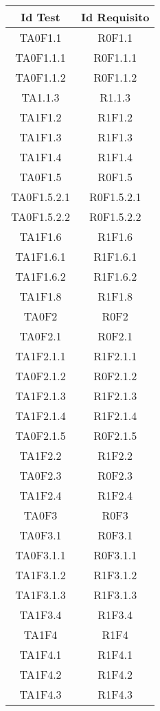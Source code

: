 	\begin{longtable}{|c|c|}
		\hline
		\textbf{Id Test} & \textbf{Id Requisito}\\
		\hline
		\endhead
		TA0F1.1&R0F1.1 \\ \hline
		TA0F1.1.1&R0F1.1.1 \\ \hline
		TA0F1.1.2&R0F1.1.2 \\ \hline
		TA1.1.3&R1.1.3 \\ \hline
		TA1F1.2&R1F1.2 \\ \hline
		TA1F1.3&R1F1.3 \\ \hline
		TA1F1.4&R1F1.4 \\ \hline
		TA0F1.5&R0F1.5 \\ \hline
		TA0F1.5.2.1&R0F1.5.2.1 \\ \hline
		TA0F1.5.2.2&R0F1.5.2.2 \\ \hline
		TA1F1.6&R1F1.6 \\ \hline
		TA1F1.6.1&R1F1.6.1 \\ \hline
		TA1F1.6.2&R1F1.6.2 \\ \hline
		TA1F1.8&R1F1.8 \\ \hline
		TA0F2&R0F2 \\ \hline
		TA0F2.1&R0F2.1 \\ \hline
		TA1F2.1.1&R1F2.1.1 \\ \hline
		TA0F2.1.2&R0F2.1.2 \\ \hline
		TA1F2.1.3&R1F2.1.3 \\ \hline
		TA1F2.1.4&R1F2.1.4 \\ \hline
		TA0F2.1.5&R0F2.1.5 \\ \hline
		TA1F2.2&R1F2.2 \\ \hline
		TA0F2.3&R0F2.3 \\ \hline
		TA1F2.4&R1F2.4 \\ \hline
		TA0F3&R0F3 \\ \hline
		TA0F3.1&R0F3.1 \\ \hline
		TA0F3.1.1&R0F3.1.1 \\ \hline
		TA1F3.1.2&R1F3.1.2 \\ \hline
		TA1F3.1.3&R1F3.1.3 \\ \hline
		TA1F3.4&R1F3.4 \\ \hline
		TA1F4&R1F4 \\ \hline
		TA1F4.1&R1F4.1 \\ \hline
		TA1F4.2&R1F4.2 \\ \hline
		TA1F4.3&R1F4.3 \\ \hline
	\end{longtable}

